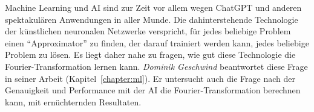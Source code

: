 Machine Learning und AI sind zur Zeit vor allem wegen ChatGPT und anderen
spektakulären Anwendungen in aller Munde.
Die dahinterstehende Technologie der künstlichen neuronalen Netzwerke
verspricht, für jedes beliebige Problem einen ``Approximator'' zu finden,
der darauf trainiert werden kann, jedes beliebige Problem zu lösen.
Es liegt daher nahe zu fragen, wie gut diese Technologie die
Fourier-Transformation lernen kann.
{\em Dominik Geschwind} beantwortet diese Frage in seiner Arbeit
(Kapitel~\ref{chapter:ml}).
Er untersucht auch die Frage nach der Genauigkeit und Performance mit der
AI die Fourier-Transformation berechnen kann, mit ernüchternden Resultaten.








